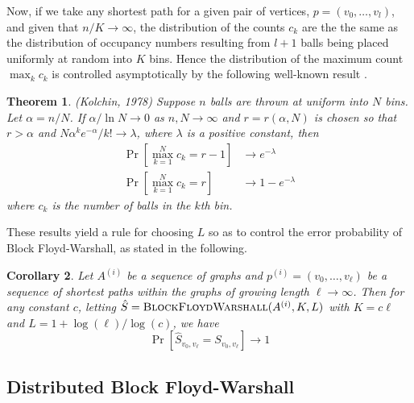 \documentclass{article} %
\newtheorem{theorem}{Theorem}[section]
\newtheorem{corollary}[theorem]{Corollary}
\begin{document}
Now, if we take any shortest path for a given pair of vertices, $p =
(v_0,\hdots, v_l)$, and given that $n/K \to \infty$, the distribution of the counts $c_k$
are the the same as the distribution of occupancy numbers resulting
from $l+1$ balls being placed uniformly at random into $K$ bins.
Hence the distribution of the maximum count $\max_k c_k$ is controlled
asymptotically by the following well-known result \cite{kolchin1978random}.

\begin{theorem}\emph{(Kolchin, 1978)}
Suppose $n$ balls are thrown at uniform into $N$ bins.  Let $\alpha =
n/N$.  If $\alpha/\ln N \to 0$ as $n, N \to \infty$ and $r = r(\alpha,
N)$ is chosen so that $r > \alpha$ and $N\alpha^k e^{-\alpha}/k! \to \lambda$,
where $\lambda$ is a positive constant, then
\begin{align*}
\Pr[\max_{k=1}^N c_k = r-1] &\to e^{-\lambda}\\
\Pr[\max_{k=1}^N c_k = r] & \to 1-e^{-\lambda}
\end{align*}
where $c_k$ is the number of balls in the $k$th bin.
\end{theorem}

These results yield a rule for choosing $L$ so as to control the error
probability of Block Floyd-Warshall, as stated in the following.

\begin{corollary}
Let $A^{(i)}$ be a sequence of graphs and $p^{(i)} = (v_0,\hdots, v_\ell)$ be a sequence of
shortest paths within the graphs of growing length $\ell \to \infty$.
Then for any constant $c$, letting $\hat{S} = \text{\sc BlockFloydWarshall}(A^{(i)}, K, L)$
with $K = c\ell$ and $L = 1 + \log(\ell)/\log(c)$, we have
\[
\Pr[\hat{S}_{v_0, v_\ell} = S_{v_0, v_\ell}] \to 1
\]
\end{corollary}

\subsection{Distributed Block Floyd-Warshall}



\end{document}
